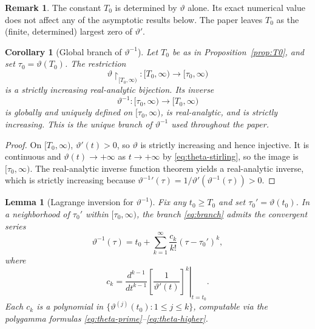 \documentclass[11pt]{article}
\numberwithin{equation}{section}
\theoremstyle{plain}
\newtheorem{lemma}[theorem]{Lemma}
\newtheorem{corollary}[theorem]{Corollary}
\theoremstyle{definition}
\newtheorem{remark}[theorem]{Remark}
\begin{document}
\begin{remark}
The constant \(T_0\) is determined by \(\vartheta\) alone. Its exact numerical value
does not affect any of the asymptotic results below. The paper leaves \(T_0\) as the
(finite, determined) largest zero of \(\vartheta'\).
\end{remark}

\begin{corollary}[Global branch of \(\vartheta^{-1}\)]
\label{cor:branch}
Let \(T_0\) be as in Proposition~\ref{prop:T0}, and set \(\tau_0=\vartheta(T_0)\). The
restriction
\[
\vartheta\restriction_{[T_0,\infty)}:[T_0,\infty)\to[\tau_0,\infty)
\]
is a strictly increasing real-analytic bijection. Its inverse
\begin{equation}
\vartheta^{-1}:[\tau_0,\infty)\to[T_0,\infty)
\label{eq:branch}
\end{equation}
is globally and uniquely defined on \([\tau_0,\infty)\), is real-analytic, and is
strictly increasing. This is the unique branch of \(\vartheta^{-1}\) used throughout
the paper.
\end{corollary}

\begin{proof}
On \([T_0,\infty)\), \(\vartheta'(t)>0\), so \(\vartheta\) is strictly increasing and
hence injective. It is continuous and \(\vartheta(t)\to+\infty\) as \(t\to+\infty\)
by \eqref{eq:theta-stirling}, so the image is \([\tau_0,\infty)\). The real-analytic
inverse function theorem yields a real-analytic inverse, which is strictly increasing
because \(\vartheta^{-1}{}'(\tau)=1/\vartheta'(\vartheta^{-1}(\tau))>0\).
\end{proof}

\begin{lemma}[Lagrange inversion for \(\vartheta^{-1}\)]
\label{lem:lagrange}
Fix any \(t_0\ge T_0\) and set \(\tau_0'=\vartheta(t_0)\). In a neighborhood of
\(\tau_0'\) within \([\tau_0,\infty)\), the branch \eqref{eq:branch} admits the
convergent series
\begin{equation}
\vartheta^{-1}(\tau)
=
t_0+\sum_{k=1}^\infty \frac{c_k}{k!}(\tau-\tau_0')^k,
\label{eq:lagrange-series}
\end{equation}
where
\begin{equation}
c_k
=
\left.
\frac{d^{k-1}}{dt^{k-1}}
\left[\frac{1}{\vartheta'(t)}\right]^k
\right|_{t=t_0}.
\label{eq:lagrange-coeff}
\end{equation}
Each \(c_k\) is a polynomial in
\(\{\vartheta^{(j)}(t_0):1\le j\le k\}\), computable via the polygamma formulas
\eqref{eq:theta-prime}--\eqref{eq:theta-higher}.
\end{lemma}
\end{document}
